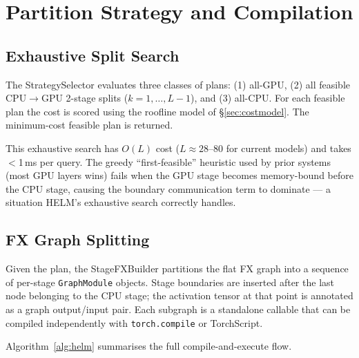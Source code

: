 \documentclass[lettersize,journal]{IEEEtran}
\begin{document}
\section{Partition Strategy and Compilation}
\label{sec:strategy}

\subsection{Exhaustive Split Search}

The StrategySelector evaluates three classes of plans:
(1) all-GPU, (2) all feasible CPU$\to$GPU 2-stage splits ($k = 1,\ldots,L-1$),
and (3) all-CPU. For each feasible plan the cost is scored using the roofline
model of \S\ref{sec:costmodel}. The minimum-cost feasible plan is returned.

This exhaustive search has $O(L)$ cost ($L \approx 28$--$80$ for current
models) and takes $<$1\,ms per query. The greedy ``first-feasible'' heuristic
used by prior systems (most GPU layers wins) fails when the GPU stage becomes
memory-bound before the CPU stage, causing the boundary communication term
to dominate --- a situation HELM's exhaustive search correctly handles.

\subsection{FX Graph Splitting}

Given the plan, the StageFXBuilder partitions the flat FX graph into a
sequence of per-stage \texttt{GraphModule} objects. Stage boundaries are
inserted after the last node belonging to the CPU stage; the activation
tensor at that point is annotated as a graph output/input pair. Each
subgraph is a standalone callable that can be compiled independently with
\texttt{torch.compile} or TorchScript.

Algorithm~\ref{alg:helm} summarises the full compile-and-execute flow.
\end{document}
